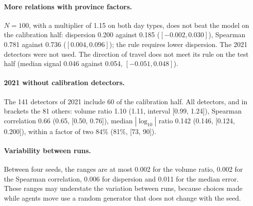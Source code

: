 \documentclass[11pt,a4paper]{article}
\begin{document}
\begin{table}[htbp]
\centering
\caption{Correction with subsets of detectors, depth 3, five repeats, on a fixed 20\% of complete detectors held out. Hourly error of the held-out detectors.}
\label{tab:exp_curve}

\end{table}

\paragraph{More relations with province factors.} $N=100$, with a multiplier of 1.15 on both day types, does not beat the model on the calibration half: dispersion 0.200 against 0.185 ($[-0.002, 0.030]$), Spearman 0.781 against 0.736 ($[0.004, 0.096]$); the rule requires lower dispersion. The 2021 detectors were not used. The direction of travel does not meet its rule on the test half (median signal 0.046 against 0.054, $[-0.051, 0.048]$).

\paragraph{2021 without calibration detectors.} The 141 detectors of 2021 include 60 of the calibration half. All detectors, and in brackets the 81 others: volume ratio 1.10 (1.11, interval [0.99, 1.24]), Spearman correlation 0.66 (0.65, [0.50, 0.76]), median $|\log_{10}|$ ratio 0.142 (0.146, [0.124, 0.200]), within a factor of two 84\% (81\%, [73, 90]).

\paragraph{Variability between runs.} Between four seeds, the ranges are at most 0.002 for the volume ratio, 0.002 for the Spearman correlation, 0.006 for dispersion and 0.011 for the median error. These ranges may understate the variation between runs, because choices made while agents move use a random generator that does not change with the seed.
\end{document}
